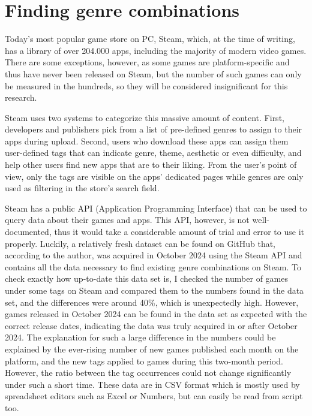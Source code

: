 \section{Finding genre combinations}

Today's most popular game store on PC, Steam\cite{steam}, which, at the time of writing, has a library of over 204.000 apps, including the majority of modern video games. There are some exceptions, however, as some games are platform-specific and thus have never been released on Steam, but the number of such games can only be measured in the hundreds, so they will be considered insignificant for this research.

Steam uses two systems to categorize this massive amount of content. First, developers and publishers pick from a list of pre-defined genres to assign to their apps during upload. Second, users who download these apps can assign them user-defined tags that can indicate genre, theme, aesthetic or even difficulty, and help other users find new apps that are to their liking. From the user's point of view, only the tags are visible on the apps' dedicated pages while genres are only used as filtering in the store's search field.

Steam has a public API (Application Programming Interface) that can be used to query data about their games and apps. This API, however, is not well-documented, thus it would take a considerable amount of trial and error to use it properly. Luckily, a relatively fresh dataset\cite{steamCatalogInsight2024} can be found on GitHub that, according to the author, was acquired in October 2024 using the Steam API and contains all the data necessary to find existing genre combinations on Steam. To check exactly how up-to-date this data set is, I checked the number of games under some tags on Steam and compared them to the numbers found in the data set, and the differences were around 40\%, which is unexpectedly high. However, games released in October 2024 can be found in the data set as expected with the correct release dates, indicating the data was truly acquired in or after October 2024. The explanation for such a large difference in the numbers could be explained by the ever-rising number of new games published each month on the platform, and the new tags applied to games during this two-month period. However, the ratio between the tag occurrences could not change significantly under such a short time. These data are in CSV format which is mostly used by spreadsheet editors such as Excel or Numbers, but can easily be read from script too.

